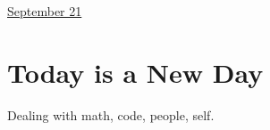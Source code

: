 \documentclass[11pt,letterpaper]{article}
\begin{document}
\href{run:2025-09-21.tex}{\Huge September 21} 

\section{Today is a New Day}

Dealing with math, code, people, self. 


 

\end{document}
